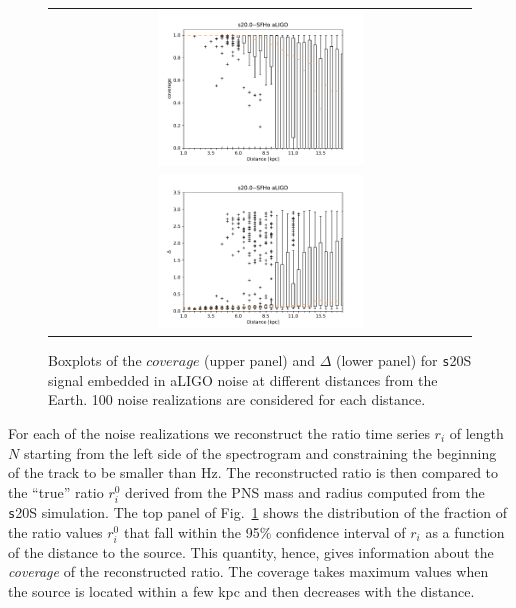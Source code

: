 \begin{figure}[t]
  \centering
  \begin{tabular}{c}
    \includegraphics[width=0.5\textwidth]{plots/s20--SFHo_covpbb_boxplot_aLIGO} \\
    \includegraphics[width=0.5\textwidth]{plots/s20--SFHo_error_boxplot_aLIGO} \\
  \end{tabular}
    
 \caption{Boxplots of the $coverage$ (upper panel) and $\Delta$ (lower panel) for {\texttt s20S} signal embedded in aLIGO noise at different distances from the Earth. 100 noise realizations are considered for each distance. }
  \label{fig:s20results}
\end{figure}

For each of the noise realizations we reconstruct the ratio time series {$r_i$} of length $N$ starting from the left side of the spectrogram and constraining the beginning of the track to be smaller than \unit[200]{Hz}. 
The reconstructed ratio is then compared to the ``true'' ratio {$r_i^0$} derived from the PNS mass and radius computed from the {\texttt s20S} simulation. The top panel of Fig.~\ref{fig:s20results} shows the distribution of the fraction of the ratio values {$r_i^0$} that fall within the 95\% confidence interval of {$r_i$} as a function of the distance to the source. This quantity, hence, gives information about the {\it coverage} of the reconstructed ratio. The coverage takes maximum values when the source is located within a few kpc and then decreases with the distance.

